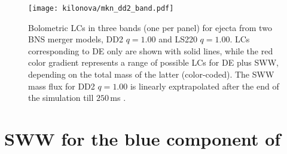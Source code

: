 
\begin{figure}[t]
    \centering
    \texttt{[image: kilonova/mkn\_dd2\_band.pdf]}
    \caption{
        Bolometric \acp{LC} in three bands (one per panel) for 
        ejecta from two \ac{BNS} merger models, 
        DD2 $q=1.00$ and LS220 $q=1.00$. \acp{LC} corresponding to 
        \ac{DE} only are shown with solid lines, while the red color gradient 
        represents a range of possible \acp{LC} for \ac{DE} plus \ac{SWW}, 
        depending on the total mass of the latter (color-coded). 
        The \ac{SWW} mass flux for DD2 $q=1.00$ is linearly exptrapolated 
        after the end of the simulation till $250\,$ms \pmerg{}.
%        
    }
    \label{fig:knlc}
\end{figure}





\section{\ac{SWW} for the blue component of \AT{}}\label{sec:kilonova:result}

